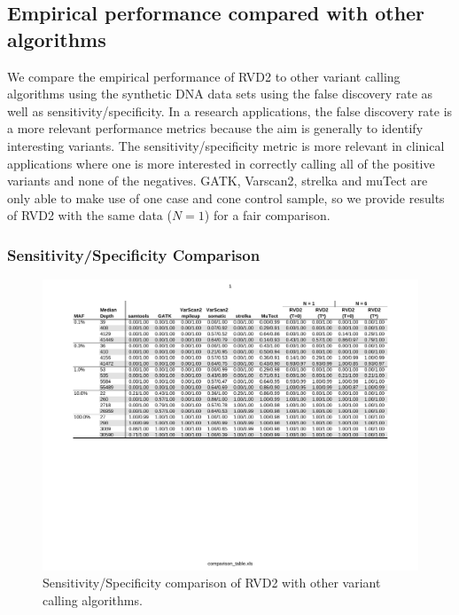\documentclass{bioinfo}
\begin{document}
\subsection{Empirical performance compared with other algorithms}\label{sec:comparison}

We compare the empirical performance of RVD2 to other variant calling algorithms using the synthetic DNA data sets using the false discovery rate as well as sensitivity/specificity. In a research applications, the false discovery rate is a more relevant performance metrics because the aim is generally to identify interesting variants. The sensitivity/specificity metric is more relevant in clinical applications where one is more interested in correctly calling all of the positive variants and none of the negatives. GATK, Varscan2, strelka and muTect are only able to make use of one case and cone control sample, so we provide results of RVD2 with the same data ($N=1$) for a fair comparison.


\subsubsection*{Sensitivity/Specificity Comparison}

\begin{figure}[!tpb]
\begin{center}
\includegraphics[width=1\textwidth]{pdf_figs/comparison_table_ss.pdf}
\caption{Sensitivity/Specificity comparison of RVD2 with other variant calling algorithms.}
\label{tbl:comparison_ss}
\end{center}
\end{figure}
\end{document}

